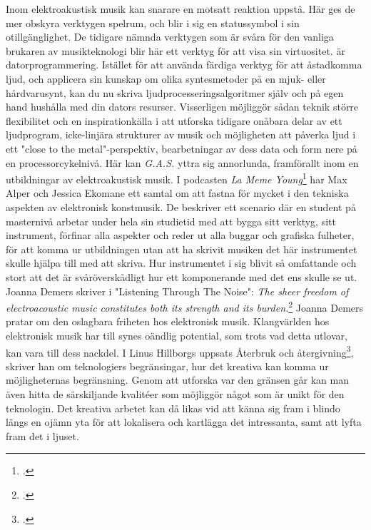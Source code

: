\documentclass{article}
\begin{document}


Inom elektroakustisk musik kan snarare en motsatt reaktion uppstå. Här ges de mer obskyra verktygen spelrum,
och blir i sig en statussymbol i sin otillgänglighet. De tidigare nämnda verktygen som är svåra för den
vanliga brukaren av musikteknologi blir här ett verktyg för att visa sin virtuositet. 
är datorprogrammering. 
Istället för att använda färdiga verktyg för att åstadkomma ljud, och applicera sin kunskap om olika
syntesmetoder på en mjuk- eller hårdvarusynt, kan du nu skriva ljudprocesseringsalgoritmer själv och på egen
hand hushålla med din dators resurser. Visserligen möjliggör sådan teknik större flexibilitet och en
inspirationkälla i att utforska tidigare onåbara delar av ett ljudprogram, icke-linjära strukturer av musik
och möjligheten att påverka ljud i ett "close to the metal"-perspektiv, bearbetningar av dess data och form
nere på en processorcykelnivå. Här kan \emph{G.A.S.} yttra sig annorlunda, framförallt inom en utbildningar av
elektroakustisk musik. I podcasten \emph{La Meme Young}\footcite{LaMemeYoung} har Max Alper och Jessica Ekomane ett samtal om att
fastna för mycket i den tekniska aspekten av elektronisk konstmusik. De beskriver ett scenario där en student
på masternivå arbetar under hela sin studietid med att bygga sitt verktyg, sitt instrument, förfinar alla
aspekter och reder
ut alla buggar och grafiska fulheter, för att komma ur utbildningen utan att ha skrivit
musiken det här instrumentet skulle hjälpa till med att skriva. Hur instrumentet i sig blivit så omfattande
och stort att det är svåröverskådligt hur ett komponerande med det ens skulle se ut. 
Joanna Demers skriver i "Listening Through The Noise": \emph{
	The sheer freedom of electroacoustic music constitutes both its strength and its
	burden.}\footcite{JoannaDemers}
Joanna Demers pratar om den oslagbara friheten hos elektronisk musik. Klangvärlden hos elektronisk musik har
till synes oändlig potential, som trots vad detta utlovar, kan vara till dess nackdel. I Linus Hillborgs uppsats
Återbruk och återgivning\footcite{LinusHillborg}, skriver han om teknologiers begränsingar, hur det kreativa
kan komma ur möjligheternas begränsning. Genom att utforska var den gränsen går kan man även hitta de
särskiljande kvalitéer som möjliggör något som är unikt för den teknologin. Det kreativa arbetet kan då likas
vid att känna sig fram i blindo längs en ojämn yta för att lokalisera och kartlägga det intressanta, samt att
lyfta fram det i ljuset. 
\end{document}
